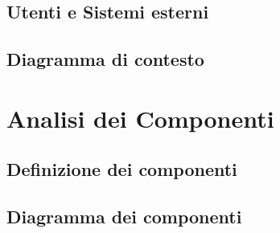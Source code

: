 \documentclass{article}
\begin{document}
\subsection{Utenti e Sistemi esterni}
\subsection{Diagramma di contesto}
\clearpage

\section{Analisi dei Componenti}
\subsection{Definizione dei componenti}

\subsection{Diagramma dei componenti}
\end{document}
